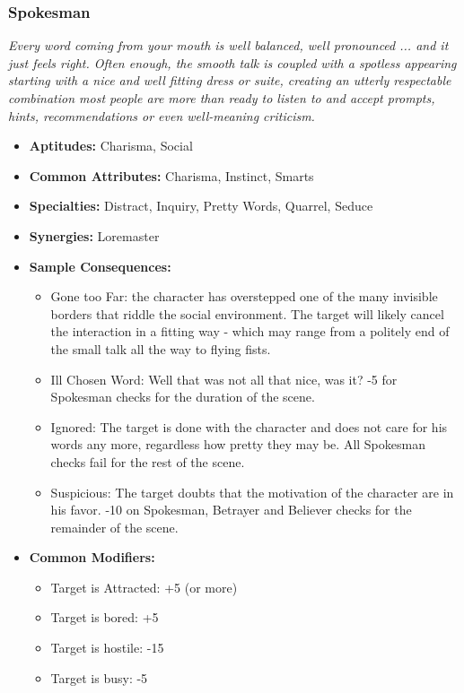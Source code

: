 \subsubsection{Spokesman}\label{Spokesman}
\textit{Every word coming from your mouth is well balanced, well pronounced ... and it just feels right.
Often enough, the smooth talk is coupled with a spotless appearing starting with a nice and well fitting dress or suite, creating an utterly respectable combination most people are more than ready to listen to and accept prompts, hints, recommendations or even well-meaning criticism.}
\begin{itemize}
	\item \textbf{Aptitudes:} Charisma, Social
	\item \textbf{Common Attributes:} Charisma, Instinct, Smarts
	\item \textbf{Specialties:} Distract, Inquiry, Pretty Words, Quarrel, Seduce
	\item \textbf{Synergies:} Loremaster
	\item \textbf{Sample Consequences:} 
	\begin{itemize}
		\item Gone too Far: the character has overstepped one of the many invisible borders that riddle the social environment. The target will likely cancel the interaction in a fitting way - which may range from a politely end of the small talk all the way to flying fists.
		\item Ill Chosen Word: Well that was not all that nice, was it? -5 for Spokesman checks for the duration of the scene.
		\item Ignored: The target is done with the character and does not care for his words any more, regardless how pretty they may be. All Spokesman checks fail for the rest of the scene.
		\item Suspicious: The target doubts that the motivation of the character are in his favor. -10 on Spokesman, Betrayer and Believer checks for the remainder of the scene.
	\end{itemize}
	\item \textbf{Common Modifiers:}
	\begin{itemize}
		\item Target is Attracted: +5 (or more)
		\item Target is bored: +5
		\item Target is hostile: -15
		\item Target is busy: -5
	\end{itemize}
\end{itemize}

